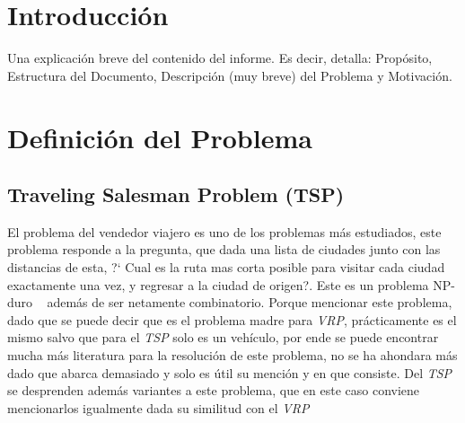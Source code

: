 \documentclass[letter, 10pt]{article}
\begin{document}
\begin{abstract}
Lo que se pretende presenta en el siguiente documento, es el problema \emph{Vehicle Routing Problem}.
\newline
Este problema es una variante del conocido \emph{Traveling Salesmen Problem (TSP)}, lo que aqu\'i se quiere realizar,
es satisfacer la demanda de los clientes, entregando se mercader\'ia, minimizando los costos asociados a las rutas de entrega. Para 
esto se cuenta con una flota de veh\'iculos, los que son todos homog\'eneos. Adem\'as de realizar la entrega, los veh\'iculos deben volver 
al punto de origen, o sea a su deposito. Lo m\'as importante en esta problem\'atica es poder satisfacer la necesidad de los clientes,
teniendo en cuenta los recursos con los cuales se cuenta, dado que no hay muchas variables en el problema, no es necesario ahondar m\'as
en esto.
A continuaci\'on se proceder\'a a definir el problema y buscar un m\'etodo que logre obtener una soluci\'on 
mas cercana al \'optimo. Para esto, se presentara un planteamiento formal, estado del arte del problema, posibles m\'etodos 
de soluci\'on y descripci\'on del modelo matem\'atico elegido.

\end{abstract}

\section{Introducci\'on}
Una explicaci\'on breve del contenido del informe. Es decir, detalla: Prop\'osito, Estructura del Documento, Descripci\'on (muy breve) del Problema y Motivaci\'on.

\section{Definici\'on del Problema}



\subsection{Traveling Salesman Problem (TSP)}

El problema del vendedor viajero es uno de los problemas m\'as estudiados, 
este problema responde a la pregunta, que dada una lista de ciudades 
junto con las distancias de esta, ?` Cual es la ruta mas corta posible 
para visitar cada ciudad exactamente una vez, y regresar a la ciudad de origen?. 
Este es un problema NP-duro ~\cite{TSP} adem\'as de ser netamente combinatorio. 
Porque mencionar este problema, dado que se puede decir que
es el problema madre para \emph{VRP}, pr\'acticamente es el mismo salvo que para el 
\emph{TSP} solo es un veh\'iculo, por ende se puede encontrar mucha m\'as literatura para 
la resoluci\'on de este problema, no se ha ahondara m\'as dado que abarca demasiado y solo 
es \'util su menci\'on y en que consiste.
\newline
Del \emph{TSP} se desprenden adem\'as variantes a este problema, que en este caso conviene 
mencionarlos igualmente dada su similitud con el \emph{VRP} ~\cite{TSP}
\end{document}
